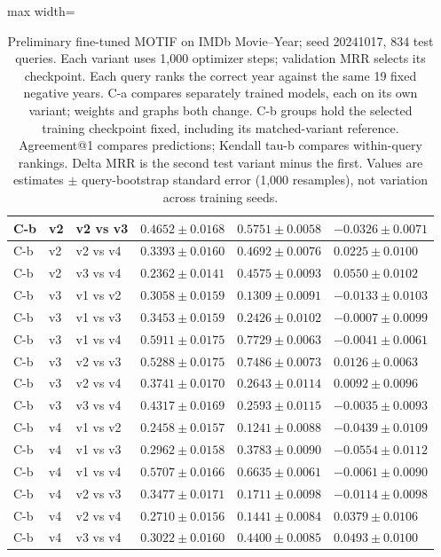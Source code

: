 \begin{table}[htbp]
\begin{adjustbox}{max width=\linewidth}
\begin{tabular}{|l|l|l|l|l|l|}
\hline
C-b & v2 & v2 vs v3 & $0.4652 \pm 0.0168$ & $0.5751 \pm 0.0058$ & $-0.0326 \pm 0.0071$ \\
\hline
C-b & v2 & v2 vs v4 & $0.3393 \pm 0.0160$ & $0.4692 \pm 0.0076$ & $0.0225 \pm 0.0100$ \\
\hline
C-b & v2 & v3 vs v4 & $0.2362 \pm 0.0141$ & $0.4575 \pm 0.0093$ & $0.0550 \pm 0.0102$ \\
\hline
C-b & v3 & v1 vs v2 & $0.3058 \pm 0.0159$ & $0.1309 \pm 0.0091$ & $-0.0133 \pm 0.0103$ \\
\hline
C-b & v3 & v1 vs v3 & $0.3453 \pm 0.0159$ & $0.2426 \pm 0.0102$ & $-0.0007 \pm 0.0099$ \\
\hline
C-b & v3 & v1 vs v4 & $0.5911 \pm 0.0175$ & $0.7729 \pm 0.0063$ & $-0.0041 \pm 0.0061$ \\
\hline
C-b & v3 & v2 vs v3 & $0.5288 \pm 0.0175$ & $0.7486 \pm 0.0073$ & $0.0126 \pm 0.0063$ \\
\hline
C-b & v3 & v2 vs v4 & $0.3741 \pm 0.0170$ & $0.2643 \pm 0.0114$ & $0.0092 \pm 0.0096$ \\
\hline
C-b & v3 & v3 vs v4 & $0.4317 \pm 0.0169$ & $0.2593 \pm 0.0115$ & $-0.0035 \pm 0.0093$ \\
\hline
C-b & v4 & v1 vs v2 & $0.2458 \pm 0.0157$ & $0.1241 \pm 0.0088$ & $-0.0439 \pm 0.0109$ \\
\hline
C-b & v4 & v1 vs v3 & $0.2962 \pm 0.0158$ & $0.3783 \pm 0.0090$ & $-0.0554 \pm 0.0112$ \\
\hline
C-b & v4 & v1 vs v4 & $0.5707 \pm 0.0166$ & $0.6635 \pm 0.0061$ & $-0.0061 \pm 0.0090$ \\
\hline
C-b & v4 & v2 vs v3 & $0.3477 \pm 0.0171$ & $0.1711 \pm 0.0098$ & $-0.0114 \pm 0.0098$ \\
\hline
C-b & v4 & v2 vs v4 & $0.2710 \pm 0.0156$ & $0.1441 \pm 0.0084$ & $0.0379 \pm 0.0106$ \\
\hline
C-b & v4 & v3 vs v4 & $0.3022 \pm 0.0160$ & $0.4400 \pm 0.0085$ & $0.0493 \pm 0.0100$ \\
\hline
\end{tabular}
\end{adjustbox}
\caption{Preliminary fine-tuned MOTIF on IMDb Movie--Year; seed 20241017, 834 test queries. Each variant uses 1,000 optimizer steps; validation MRR selects its checkpoint. Each query ranks the correct year against the same 19 fixed negative years. C-a compares separately trained models, each on its own variant; weights and graphs both change. C-b groups hold the selected training checkpoint fixed, including its matched-variant reference. Agreement@1 compares predictions; Kendall tau-b compares within-query rankings. Delta MRR is the second test variant minus the first. Values are estimates $\pm$ query-bootstrap standard error (1,000 resamples), not variation across training seeds.}
\label{tab:motif-imdb-movie-year-matrix-invariance}
\end{table}
